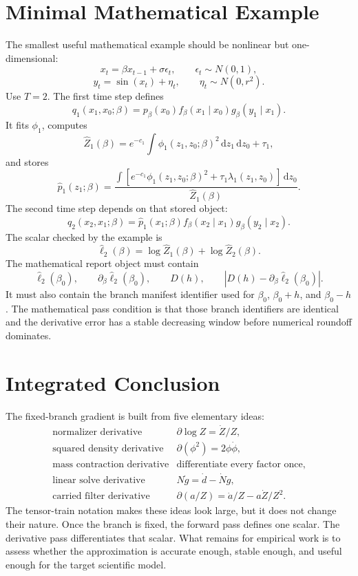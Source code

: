\documentclass[11pt]{article}
\newcommand{\dd}{\,\mathrm d}
\newcommand{\widehatell}{\widehat\ell}
\begin{document}
\section{Minimal Mathematical Example}

The smallest useful mathematical example should be nonlinear but one-dimensional:
\[
    x_t=\beta x_{t-1}+\sigma\epsilon_t,
    \qquad
    \epsilon_t\sim N(0,1),
    \tag{P19-102}
\]
\[
    y_t=\sin(x_t)+\eta_t,
    \qquad
    \eta_t\sim N(0,r^2).
    \tag{P19-103}
\]
Use \(T=2\).  The first time step defines
\[
    q_1(x_1,x_0;\beta)
    =
    p_\beta(x_0)
    f_\beta(x_1\mid x_0)
    g_\beta(y_1\mid x_1).
    \tag{P19-104}
\]
It fits \(\phi_1\), computes
\[
    \widehat Z_1(\beta)=e^{-c_1}\int \phi_1(z_1,z_0;\beta)^2
    \dd z_1\dd z_0+\tau_1,
    \tag{P19-105}
\]
and stores
\[
    \widehat p_1(z_1;\beta)
    =
    \frac{\int
    \left[e^{-c_1}\phi_1(z_1,z_0;\beta)^2+\tau_1\lambda_1(z_1,z_0)\right]
    \dd z_0}
    {\widehat Z_1(\beta)}.
    \tag{P19-106}
\]
The second time step depends on that stored object:
\[
    q_2(x_2,x_1;\beta)
    =
    \widehat p_1(x_1;\beta)
    f_\beta(x_2\mid x_1)
    g_\beta(y_2\mid x_2).
    \tag{P19-107}
\]
The scalar checked by the example is
\[
    \widehatell_2(\beta)
    =
    \log\widehat Z_1(\beta)
    +
    \log\widehat Z_2(\beta).
    \tag{P19-108}
\]
The mathematical report object must contain
\[
    \widehatell_2(\beta_0),
    \qquad
    \partial_\beta\widehatell_2(\beta_0),
    \qquad
    D(h),
    \qquad
    |D(h)-\partial_\beta\widehatell_2(\beta_0)|.
    \tag{P19-109}
\]
It must also contain the branch manifest identifier used for \(\beta_0\),
\(\beta_0+h\), and \(\beta_0-h\).  The mathematical pass condition is that
those branch identifiers are identical and the derivative error has a stable
decreasing window before numerical roundoff dominates.

\section{Integrated Conclusion}

The fixed-branch gradient is built from five elementary ideas:
\[
\begin{array}{ll}
\text{normalizer derivative} & \partial\log Z=\dot Z/Z,\\[2mm]
\text{squared density derivative} & \partial(\phi^2)=2\phi\dot\phi,\\[2mm]
\text{mass contraction derivative} & \text{differentiate every factor once},\\[2mm]
\text{linear solve derivative} & N\dot g=\dot d-\dot N g,\\[2mm]
\text{carried filter derivative} & \partial(a/Z)=\dot a/Z-a\dot Z/Z^2.
\end{array}
\tag{P19-110}
\]
The tensor-train notation makes these ideas look large, but it does not change
their nature.  Once the branch is fixed, the forward pass defines one scalar.
The derivative pass differentiates that scalar.  What remains for empirical
work is to assess whether the approximation is accurate enough, stable enough,
and useful enough for the target scientific model.
\end{document}

